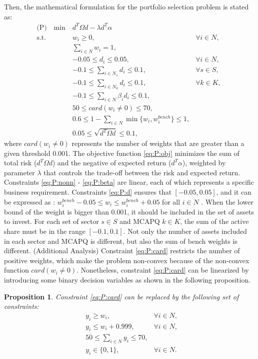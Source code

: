 \documentclass[11pt]{article}
\newtheorem{pro}{Proposition}
\begin{document}
	Then, the mathematical formulation for the portfolio selection problem is stated as:
	\begin{align}
	\text{(P)} \quad \min~ & d^T \Omega d - \lambda d^T \alpha \label{eq:P:obj}\\
	\text{s.t. } 
	& w_i \ge 0, & \forall i \in N, \label{eq:P:nonn}\\
	& \sum_{i \in N} w_i = 1, \label{eq:P:sum}\\
	& -0.05 \le d_i \le 0.05, & \forall i \in N, \label{eq:P:d}\\
	& -0.1 \le \sum_{i \in N_s} d_i \le 0.1, & \forall s \in S, \label{eq:P:sector}\\
	& -0.1 \le \sum_{i \in N_k} d_i \le 0.1, & \forall k \in K, \label{eq:P:MCAPQ}\\
	& -0.1 \le \sum_{i \in N} \beta_i d_i \le 0.1, \label{eq:P:beta}\\
	& 50 \le card(w_i \neq 0) \le 70, \label{eq:P:card}\\
	& 0.6 \le 1 - \sum_{i \in N} \min\{w_i, w^{bench}_i \} \le 1, \label{eq:P:AS}\\
	& 0.05 \le \sqrt{d^T \Omega d} \le 0.1, \label{eq:P:TE}
	\end{align}
	where $card(w_i \neq 0)$ represents the number of weights that are greater than a given threshold 0.001. The objective function \eqref{eq:P:obj} minimizes the sum of total risk ($d^T \Omega d$) and the negative of expected return ($d^T \alpha$), weighted by parameter $\lambda$ that controls the trade-off between the risk and expected return. Constraints \eqref{eq:P:nonn} - \eqref{eq:P:beta} are linear, each of which represents a specific business requirement. 
	Constraints \eqref{eq:P:d} ensures that $[-0.05, 0.05]$, and it can be expressed as : $w^{bench}_i-0.05 \le w_i \le w^{bench}_i+0.05$ for all $i \in N$ . When the lower bound of the weight is bigger than 0.001, it should be included in the set of assets to invest.  For each set of sector $s \in S$ and MCAPQ $k \in K$, the sum of the active share must be in the range $[-0.1, 0.1]$. 
	Not only the number of assets included in each sector and MCAPQ is different, but also the sum of bench weights is different. (Additional Analysis)  Constraint \eqref{eq:P:card} restricts the number of positive weights, which make the problem non-convex because of the non-convex function $card(w_i \neq 0)$. Nonetheless, constraint \eqref{eq:P:card} can be linearized by introducing some binary decision variables as shown in the following proposition.
	\begin{pro} \label{pro:AS}
		Constraint \eqref{eq:P:card} can be replaced by the following set of constraints:
		\begin{align*}
		&y_i \ge w_i, & \forall i \in N, \\
		&y_i \le w_i + 0.999, & \forall i \in N,\\
		&50 \le \sum_{i \in N} y_i \le 70, \\
		&y_i \in \{0,1\}, & \forall i \in N.
		\end{align*}
	\end{pro}
\end{document}
